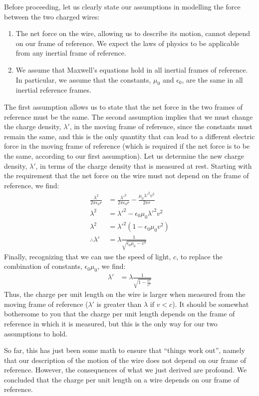 Before proceeding, let us clearly state our assumptions in modelling the force between the two charged wires:
\begin{enumerate}
\item The net force on the wire, allowing us to describe its motion, cannot depend on our frame of reference. We expect the laws of physics to be applicable from any inertial frame of reference.
\item We assume that Maxwell's equations hold in all inertial frames of reference. In particular, we assume that the constants, $\mu_0$ and $\epsilon_0$, are the same in all inertial reference frames.
\end{enumerate}
The first assumption allows us to state that the net force in the two frames of reference must be the same. The second assumption implies that we must change the charge density, $\lambda'$, in the moving frame of reference, since the constants must remain the same, and this is the only quantity that can lead to a different electric force in the moving frame of reference (which is required if the net force is to be the same, according to our first assumption). Let us determine the new charge density, $\lambda'$, in terms of the charge density that is measured at rest. Starting with the requirement that the net force on the wire must not depend on the frame of reference, we find:
\begin{align*}
\frac{\lambda^2}{2\pi \epsilon_0r}&=\frac{\lambda'^2}{2\pi \epsilon_0r}  -\frac{\mu_0 \lambda'^2 v^2}{2\pi r}\\
\lambda^2&=\lambda'^2-\epsilon_0\mu_0\lambda'^2 v^2\\
\lambda^2&=\lambda'^2(1-\epsilon_0\mu_0v^2)\\
\therefore \lambda'&=\lambda \frac{1}{\sqrt{\epsilon_0\mu_0-v^2}}
\end{align*}
Finally, recognizing that we can use the speed of light, $c$, to replace the combination of constants, $\epsilon_0\mu_0$, we find:
\begin{align*}
\lambda'&=\lambda \frac{1}{\sqrt{1-\frac{v^2}{c^2}}}
\end{align*}
Thus, the charge per unit length on the wire is larger when measured from the moving frame of reference ($\lambda'$ is greater than $\lambda$ if $v<c$). It should be somewhat bothersome to you that the charge per unit length depends on the frame of reference in which it is measured, but this is the only way for our two assumptions to hold.

So far, this has just been some math to ensure that ``things work out'', namely that our description of the motion of the wire does not depend on our frame of reference. However, the consequences of what we just derived are profound. We concluded that the charge per unit length on a wire depends on our frame of reference.

